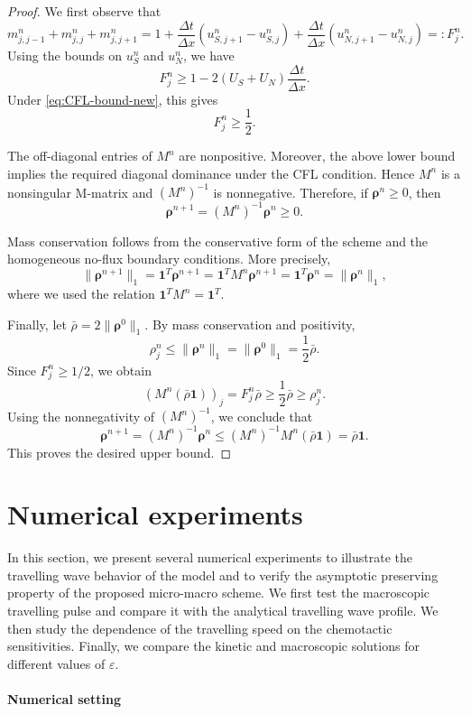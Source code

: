 \documentclass[11pt,twoside]{article}
\theoremstyle{plain}
\theoremstyle{nonumberplain}
\newtheorem{proof}{Proof}
\newcommand{\brho}{\boldsymbol{\rho}}
\begin{document}
{\begin{proof}
We first observe that
\[
m_{j,j-1}^n+m_{j,j}^n+m_{j,j+1}^n
=
1+\frac{\Delta t}{\Delta x}
\left(u_{S,j+1}^n-u_{S,j}^n\right)
+\frac{\Delta t}{\Delta x}
\left(u_{N,j+1}^n-u_{N,j}^n\right)
=:F_j^n .
\]
Using the bounds on $u_S^n$ and $u_N^n$, we have
\[
F_j^n
\ge
1-2(U_S+U_N)\frac{\Delta t}{\Delta x}.
\]
Under \eqref{eq:CFL-bound-new}, this gives
\[
F_j^n\ge \frac12 .
\]

The off-diagonal entries of $M^n$ are nonpositive. Moreover, the above
lower bound implies the required diagonal dominance under the CFL
condition. Hence $M^n$ is a nonsingular M-matrix and $(M^n)^{-1}$ is
nonnegative. Therefore, if $\brho^n\ge0$, then
\[
\brho^{n+1}=(M^n)^{-1}\brho^n\ge0.
\]

Mass conservation follows from the conservative form of the scheme and the
homogeneous no-flux boundary conditions.  More precisely, 
\[
\|\brho^{n+1}\|_1
=
\mathbf 1^T\brho^{n+1}
=
\mathbf 1^T M^n\brho^{n+1}
=
\mathbf 1^T\brho^n
=
\|\brho^n\|_1 ,
\]
where we used the relation
\(
\mathbf 1^T M^n=\mathbf 1^T .
\)

Finally, let $\bar\rho=2\|\brho^0\|_1$. By mass conservation and
positivity,
\[
\rho_j^n\le \|\brho^n\|_1=\|\brho^0\|_1=\frac12\bar\rho .
\]
Since $F_j^n\ge1/2$, we obtain
\[
(M^n(\bar\rho\mathbf 1))_j
=
F_j^n\bar\rho
\ge
\frac12\bar\rho
\ge
\rho_j^n .
\]
Using the nonnegativity of $(M^n)^{-1}$, we conclude that
\[
\brho^{n+1}
=
(M^n)^{-1}\brho^n
\le
(M^n)^{-1}M^n(\bar\rho\mathbf 1)
=
\bar\rho\mathbf 1 .
\]
This proves the desired upper bound.
\end{proof}



\section{Numerical experiments}
\label{sec:numerical}

In this section, we present several numerical experiments to illustrate
the travelling wave behavior of the model and to verify the asymptotic
preserving property of the proposed micro-macro scheme. We first test the
macroscopic travelling pulse and compare it with the analytical travelling
wave profile. We then study the dependence of the travelling speed on the
chemotactic sensitivities. Finally, we compare the kinetic and macroscopic
solutions for different values of \(\varepsilon\).

\paragraph{Numerical setting}

}
\end{document}
